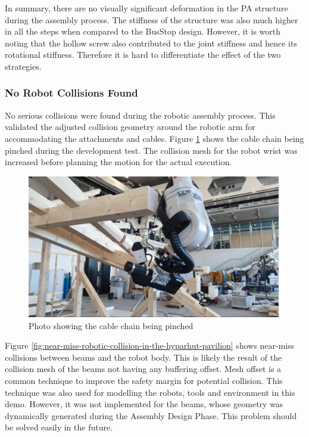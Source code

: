 In summary, there are no visually significant deformation in the PA structure during the assembly process. The stiffness of the structure was also much higher in all the steps when compared to the BusStop design. However, it is worth noting that the hollow screw also contributed to the joint stiffness and hence its rotational stiffness. Therefore it is hard to differentiate the effect of the two strategies. 

\subsubsection{No Robot Collisions Found}
\label{subsubsection:exploration-4-no-robot-collisions-found}

No serious collisions were found during the robotic assembly process. This validated the adjusted collision geometry around the robotic arm for accommodating the attachments and cables. Figure \ref{fig:cable-chain-being-pinched} shows the cable chain being pinched during the development test. The collision mesh for the robot wrist was increased before planning the motion for the actual execution.

\begin{figure}[!h]
    \centering
    \includegraphics[width=0.99\textwidth]{images/7b/img59.jpg}
    \caption{Photo showing the cable chain being pinched}
    \label{fig:cable-chain-being-pinched}
\end{figure}

 Figure \ref{fig:near-miss-robotic-collision-in-the-hyparhut-pavilion} shows near-miss collisions between beams and the robot body. This is likely the result of the collision mesh of the beams not having any buffering offset. Mesh offset is a common technique to improve the safety margin for potential collision. This technique was also used for modelling the robots, tools and environment in this demo. However, it was not implemented for the beams, whose geometry was dynamically generated during the Assembly Design Phase. This problem should be solved easily in the future.

